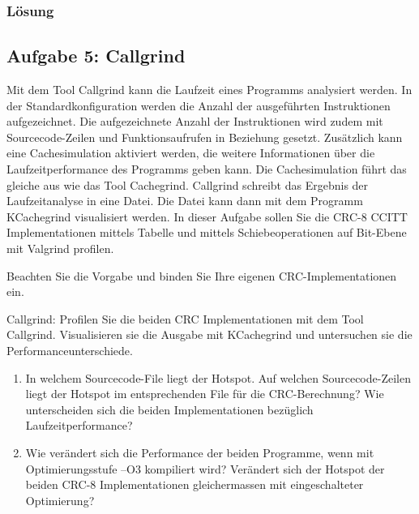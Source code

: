\subsubsection{Lösung}



\noindent\makebox[\linewidth]{\rule{\paperwidth}{0.4pt}}

\noindent\makebox[\linewidth]{\rule{\paperwidth}{0.4pt}}


\subsection{Aufgabe 5: Callgrind}
Mit dem Tool Callgrind kann die Laufzeit eines Programms analysiert werden. In der Standardkonfiguration werden die Anzahl der ausgeführten Instruktionen aufgezeichnet. Die aufgezeichnete Anzahl der Instruktionen wird zudem mit Sourcecode-Zeilen und Funktionsaufrufen in Beziehung gesetzt. Zusätzlich kann eine Cachesimulation aktiviert werden, die weitere Informationen über die Laufzeitperformance des Programms geben kann. Die Cachesimulation führt das gleiche aus wie das Tool Cachegrind. Callgrind schreibt das Ergebnis der Laufzeitanalyse in eine Datei. Die Datei kann dann mit dem Programm KCachegrind visualisiert werden.
In dieser Aufgabe sollen Sie die CRC-8 CCITT Implementationen mittels Tabelle und mittels Schiebeoperationen auf Bit-Ebene mit Valgrind profilen.

Beachten Sie die Vorgabe und binden Sie Ihre eigenen CRC-Implementationen ein.

Callgrind: Profilen Sie die beiden CRC Implementationen mit dem Tool Callgrind. Visualisieren sie die Ausgabe mit KCachegrind und untersuchen sie die Performanceunterschiede.
\begin{enumerate}
  \item In welchem Sourcecode-File liegt der Hotspot. Auf welchen Sourcecode-Zeilen liegt der Hotspot im entsprechenden File für die CRC-Berechnung? Wie unterscheiden sich die beiden Implementationen bezüglich Laufzeitperformance?
  \item Wie verändert sich die Performance der beiden Programme, wenn mit Optimierungsstufe –O3 kompiliert wird? Verändert sich der Hotspot der beiden CRC-8 Implementationen gleichermassen mit eingeschalteter Optimierung?
\end{enumerate}

